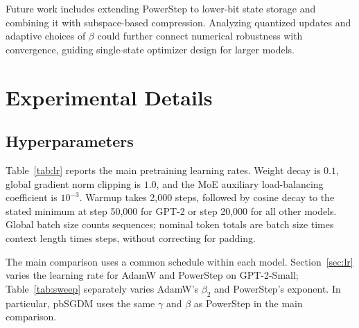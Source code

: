 \documentclass{article}
\begin{document}
Future work includes extending PowerStep to lower-bit state storage and combining it with subspace-based compression. Analyzing quantized updates and adaptive choices of $\beta$ could further connect numerical robustness with convergence, guiding single-state optimizer design for larger models.

\FloatBarrier

{}
\newpage
\appendix
\section{Experimental Details}
\label{sec:exp_app}
\subsection{Hyperparameters}

Table~\ref{tab:lr} reports the main pretraining learning rates. Weight decay is $0.1$, global gradient norm clipping is $1.0$, and the MoE auxiliary load-balancing coefficient is $10^{-3}$. Warmup takes 2,000 steps, followed by cosine decay to the stated minimum at step 50,000 for GPT-2 or step 20,000 for all other models. Global batch size counts sequences; nominal token totals are batch size times context length times steps, without correcting for padding.

The main comparison uses a common schedule within each model. Section~\ref{sec:lr} varies the learning rate for AdamW and PowerStep on GPT-2-Small; Table~\ref{tab:sweep} separately varies AdamW's $\beta_2$ and PowerStep's exponent. In particular, pbSGDM uses the same $\gamma$ and $\beta$ as PowerStep in the main comparison.
\end{document}
